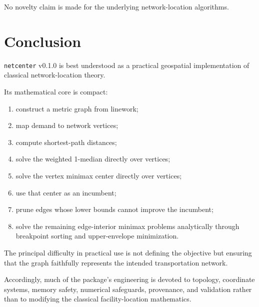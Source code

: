 \documentclass[11pt]{article}
\begin{document}
No novelty claim is made for the underlying network-location algorithms.

\section{Conclusion}

\texttt{netcenter} v0.1.0 is best understood as a practical geospatial
implementation of classical network-location theory.

Its mathematical core is compact:

\begin{enumerate}[leftmargin=1.5em]

\item construct a metric graph from linework;

\item map demand to network vertices;

\item compute shortest-path distances;

\item solve the weighted 1-median directly over vertices;

\item solve the vertex minimax center directly over vertices;

\item use that center as an incumbent;

\item prune edges whose lower bounds cannot improve the incumbent;

\item solve the remaining edge-interior minimax problems analytically through
breakpoint sorting and upper-envelope minimization.

\end{enumerate}

The principal difficulty in practical use is not defining the objective but
ensuring that the graph faithfully represents the intended transportation
network.

Accordingly, much of the package's engineering is devoted to topology,
coordinate systems, memory safety, numerical safeguards, provenance, and
validation rather than to modifying the classical facility-location
mathematics.
\end{document}

